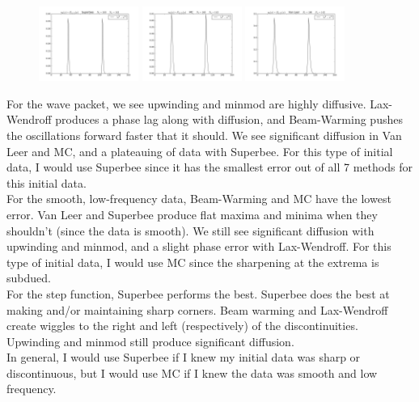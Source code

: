 \documentclass{article} %
\theoremstyle{plain}
\numberwithin{equation}{section} %
\numberwithin{figure}{section} %
\numberwithin{table}{section} %
\begin{document}
\begin{enumerate}[\ \ (a)]
\begin{figure}[ht!]
            \includegraphics[width=0.29\textwidth]{figures/power_4/problem_2_3_5_b.png}
            \includegraphics[width=0.29\textwidth]{figures/power_4/problem_2_3_6_b.png}
            \includegraphics[width=0.29\textwidth]{figures/power_4/problem_2_3_7_b.png}
        \end{figure}
        \FloatBarrier
        \pagebreak
\end{enumerate}

For the wave packet, we see upwinding and minmod are highly diffusive.  Lax-Wendroff produces a phase lag along with diffusion, and Beam-Warming pushes the oscillations forward faster that it should.  We see significant diffusion in Van Leer and MC, and a plateauing of data with Superbee.  For this type of initial data, I would use Superbee since it has the smallest error out of all 7 methods for this initial data. \\

For the smooth, low-frequency data, Beam-Warming and MC have the lowest error.  Van Leer and Superbee produce flat maxima and minima when they shouldn't (since the data is smooth).  We still see significant diffusion with upwinding and minmod, and a slight phase error with Lax-Wendroff.  For this type of initial data, I would use MC since the sharpening at the extrema is subdued. \\

For the step function, Superbee performs the best.  Superbee does the best at making and/or maintaining sharp corners.  Beam warming and Lax-Wendroff create wiggles to the right and left (respectively) of the discontinuities.  Upwinding and minmod still produce significant diffusion. \\

In general, I would use Superbee if I knew my initial data was sharp or discontinuous, but I would use MC if I knew the data was smooth and low frequency.
\end{document}
